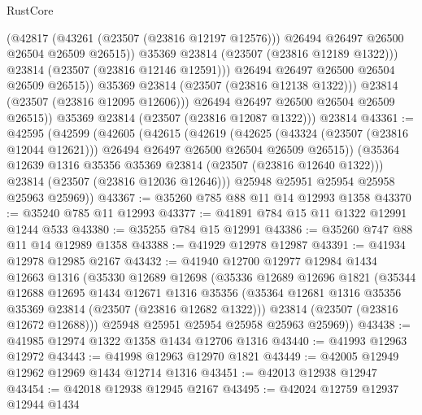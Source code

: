 \begin{lexlean}{RustCore}
\begin{coremodule}
                        (@42817
                          (@43261 (@23507 (@23816 @12197 @12576)))
                          @26494
                          @26497
                          @26500
                          @26504
                          @26509
                          @26515))
                      @35369
                      @23814
                      (@23507 (@23816 @12189 @1322)))
                    @23814
                    (@23507 (@23816 @12146 @12591)))
                  @26494
                  @26497
                  @26500
                  @26504
                  @26509
                  @26515))
              @35369
              @23814
              (@23507 (@23816 @12138 @1322)))
            @23814
            (@23507 (@23816 @12095 @12606)))
          @26494
          @26497
          @26500
          @26504
          @26509
          @26515))
      @35369
      @23814
      (@23507 (@23816 @12087 @1322)))
    @23814
@43361 := @42595
    (@42599
      (@42605
        (@42615
          (@42619
            (@42625
              (@43324 (@23507 (@23816 @12044 @12621)))
              @26494
              @26497
              @26500
              @26504
              @26509
              @26515))
          (@35364 @12639 @1316 @35356 @35369 @23814 (@23507 (@23816 @12640 @1322)))
          @23814
          (@23507 (@23816 @12036 @12646)))
        @25948
        @25951
        @25954
        @25958
        @25963
        @25969))
@43367 := @35260 @785 @88 @11 @14 @12993 @1358
@43370 := @35240 @785 @11 @12993
@43377 := @41891 @784 @15 @11 @1322 @12991 @1244 @533
@43380 := @35255 @784 @15 @12991
@43386 := @35260 @747 @88 @11 @14 @12989 @1358
@43388 := @41929 @12978 @12987
@43391 := @41934 @12978 @12985 @2167
@43432 := @41940
    @12700
    @12977
    @12984
    @1434
    @12663
    @1316
    (@35330
      @12689
      @12698
      (@35336
        @12689
        @12696
        @1821
        (@35344
          @12688
          @12695
          @1434
          @12671
          @1316
          @35356
          (@35364 @12681 @1316 @35356 @35369 @23814 (@23507 (@23816 @12682 @1322)))
          @23814
          (@23507 (@23816 @12672 @12688)))
        @25948
        @25951
        @25954
        @25958
        @25963
        @25969))
@43438 := @41985 @12974 @1322 @1358 @1434 @12706 @1316
@43440 := @41993 @12963 @12972
@43443 := @41998 @12963 @12970 @1821
@43449 := @42005 @12949 @12962 @12969 @1434 @12714 @1316
@43451 := @42013 @12938 @12947
@43454 := @42018 @12938 @12945 @2167
@43495 := @42024
    @12759
    @12937
    @12944
    @1434

\end{coremodule}
\end{lexlean}
